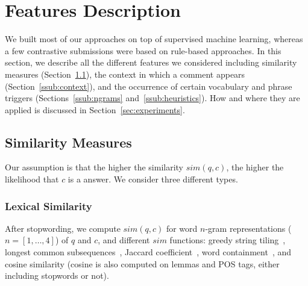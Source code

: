 \section{Features Description}
\label{sec:approach}

We built most of our approaches on top of supervised machine learning, whereas 
a few contrastive submissions were based on rule-based approaches. In this 
section, we describe all the different features we considered including 
similarity measures (Section~\ref{sub:sim}), the context in which a comment 
appears (Section~\ref{ssub:context}), and the occurrence of certain vocabulary 
and phrase triggers (Sections~\ref{ssub:ngrams} and~\ref{ssub:heuristics}). How 
and where they are applied is discussed in Section~\ref{sec:experiments}.

% 

\subsection{Similarity Measures}
\label{sub:sim}

Our assumption is that the higher the similarity  $sim(q,c)$, the higher the 
likelihood that $c$ is a \good answer. We consider three different types.

\subsubsection{Lexical Similarity}

After stopwording, we compute $sim(q, c)$ for word $n$-gram representations 
($n=[1,\ldots,4]$) of $q$ and $c$, and different $sim$ functions: greedy 
string tiling~\cite{Wise:1996}, longest common 
subsequences~\cite{Allison:1986}, Jaccard coefficient~\cite{Jaccard:1901}, word 
containment~\cite{Lyon:2001}, and cosine similarity (cosine is also computed on 
lemmas and POS tags, either including stopwords or not).

